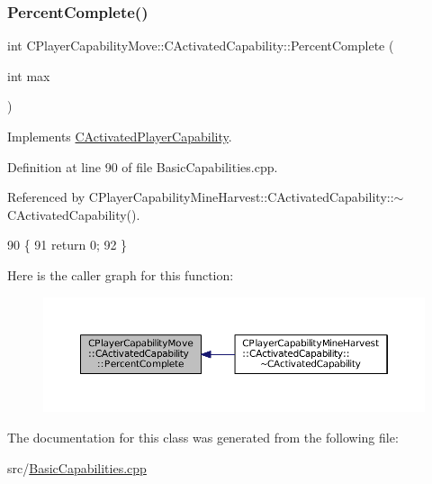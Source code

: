 \hypertarget{classCPlayerCapabilityMove_1_1CActivatedCapability_a1696dd16d89d0978284a95dd1531d0d5}{}\label{classCPlayerCapabilityMove_1_1CActivatedCapability_a1696dd16d89d0978284a95dd1531d0d5} 
\subsubsection{\texorpdfstring{Percent\+Complete()}{PercentComplete()}}
{\footnotesize\ttfamily int C\+Player\+Capability\+Move\+::\+C\+Activated\+Capability\+::\+Percent\+Complete (\begin{DoxyParamCaption}\item[{int}]{max }\end{DoxyParamCaption})\hspace{0.3cm}{\ttfamily [virtual]}}



Implements \hyperlink{classCActivatedPlayerCapability_a405dc6076058006a4f801727de4cfe4d}{C\+Activated\+Player\+Capability}.



Definition at line 90 of file Basic\+Capabilities.\+cpp.



Referenced by C\+Player\+Capability\+Mine\+Harvest\+::\+C\+Activated\+Capability\+::$\sim$\+C\+Activated\+Capability().


\begin{DoxyCode}
90                                                                      \{
91     \textcolor{keywordflow}{return} 0;
92 \}
\end{DoxyCode}
Here is the caller graph for this function\+:\nopagebreak
\begin{figure}[H]
\begin{center}
\leavevmode
\includegraphics[width=350pt]{classCPlayerCapabilityMove_1_1CActivatedCapability_a1696dd16d89d0978284a95dd1531d0d5_icgraph}
\end{center}
\end{figure}


The documentation for this class was generated from the following file\+:\begin{DoxyCompactItemize}
\item 
src/\hyperlink{BasicCapabilities_8cpp}{Basic\+Capabilities.\+cpp}\end{DoxyCompactItemize}

